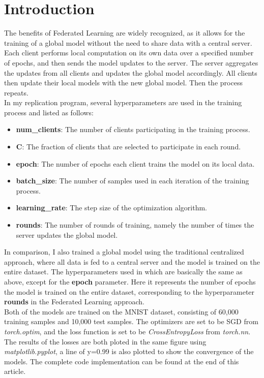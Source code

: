\documentclass[a4paper,12pt]{article}
\begin{document}
\section{Introduction}
The benefits of Federated Learning are widely recognized, 
as it allows for the training of a global model without the need to share data 
with a central server. Each client performs local computation on its own data over 
a specified number of epochs, and then sends the model updates to the server.
The server aggregates the updates from all clients and updates the global model accordingly.
All clients then update their local models with the new global model. 
Then the process repeats.\\
In my replication program, several hyperparameters are used in the training process and listed as follows:
\begin{itemize} 
  \item \textbf{num\_clients}:
  The number of clients participating in the training process.
  \item \textbf{C}: The fraction of clients that are selected to participate in each round.
  \item \textbf{epoch}: The number of epochs each client trains the model on its local data.
  \item \textbf{batch\_size}: The number of samples used in each iteration of the training process.
  \item \textbf{learning\_rate}: The step size of the optimization algorithm.
  \item \textbf{rounds}: The number of rounds of training, namely the number of times the server updates the global model.
\end{itemize}
In comparison, I also trained a global model using the traditional centralized approach, 
where all data is fed to a central server and the model is trained on the entire dataset.
The hyperparameters used in which are basically the same as above, except for the \textbf{epoch} parameter. 
Here it represents the number of epochs the model is trained on the entire dataset,
corresponding to the hyperparameter \textbf{rounds} in the Federated Learning approach.
\\
Both of the models are trained on the MNIST dataset, 
consisting of 60,000 training samples and 10,000 test samples.
The optimizers are set to be SGD from \textit{torch.optim}, and the loss function is set to be \textit{CrossEntropyLoss} from \textit{torch.nn}.
\\
The results of the losses are both ploted in the same figure using \textit{matplotlib.pyplot}, a line of 
y=0.99 is also plotted to show the convergence of the models. The complete code implementation can be
found at the end of this article.
\end{document}
